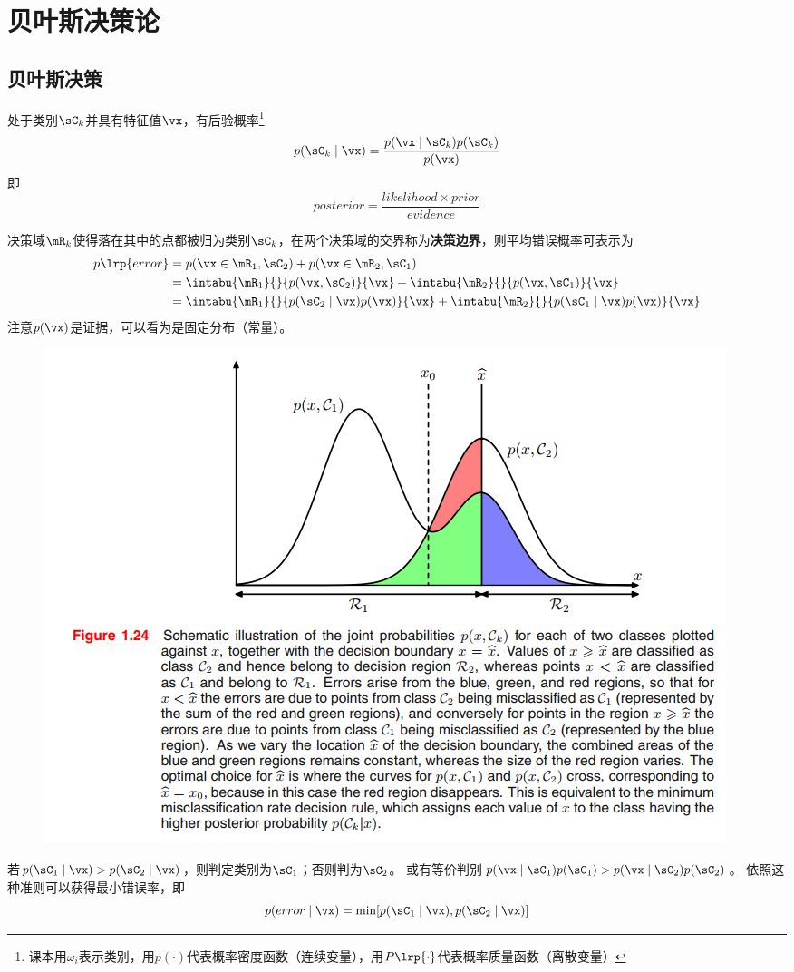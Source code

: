 
\section{贝叶斯决策论} %

\subsection{贝叶斯决策}
处于类别$\sC_k$并具有特征值$\vx$，有后验概率\footnote{课本用$\omega_i$表示类别，用$p(\cdot)$代表概率密度函数（连续变量），用$P\lrp{\cdot}$代表概率质量函数（离散变量）}
\[p(\sC_k\mid\vx)=\frac{p(\vx\mid\sC_k)p(\sC_k)}{p(\vx)}\]
即
\[posterior=\frac{likelihood\times prior}{evidence}\]

决策域$\mR_k$使得落在其中的点都被归为类别$\sC_k$，在两个决策域的交界称为\textbf{决策边界}，则平均错误概率可表示为
\[\begin{aligned}
p\lrp{error}&=p(\vx\in\mR_1,\sC_2)+p(\vx\in\mR_2,\sC_1)\\
&=\intabu{\mR_1}{}{p(\vx,\sC_2)}{\vx}+\intabu{\mR_2}{}{p(\vx,\sC_1)}{\vx}\\
&=\intabu{\mR_1}{}{p(\sC_2\mid\vx)p(\vx)}{\vx}+\intabu{\mR_2}{}{p(\sC_1\mid\vx)p(\vx)}{\vx}\\
\end{aligned}\]
注意$p(\vx)$是证据，可以看为是固定分布（常量）。

\begin{figure}[H]
\centering
\includegraphics[width=0.8\linewidth]{fig/bayesian_decision.png}
\end{figure}
\begin{theorem}
若$p(\sC_1\mid \vx)>p(\sC_2\mid \vx)$，则判定类别为$\sC_1$；否则判为$\sC_2$。
或有等价判别$p(\vx\mid \sC_1)p(\sC_1)>p(\vx\mid\sC_2)p(\sC_2)$。
依照这种准则可以获得最小错误率，即
\[p(error\mid \vx)=\min [p(\sC_1\mid \vx),p(\sC_2\mid \vx)]\]
\end{theorem}

